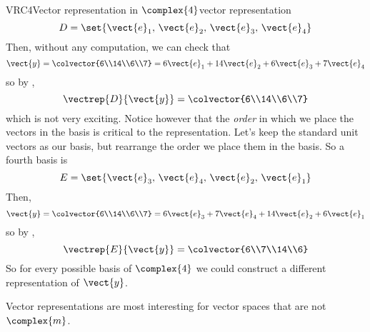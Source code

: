 \begin{example}{VRC4}{Vector representation in $\complex{4}$}{vector representation}
\begin{equation*}
D=\set{\vect{e}_1,\,\vect{e}_2,\,\vect{e}_3,\,\vect{e}_4}
\end{equation*}
%
Then, without any computation, we can check that
%
\begin{equation*}
\vect{y}=\colvector{6\\14\\6\\7}=6\vect{e}_1+14\vect{e}_2+6\vect{e}_3+7\vect{e}_4
\end{equation*}
%
so by ,
%
\begin{equation*}
\vectrep{D}{\vect{y}}=\colvector{6\\14\\6\\7}
\end{equation*}
%
which is not very exciting.  Notice however that the {\em order} in which we place the vectors in the basis is critical to the representation.  Let's keep the standard unit vectors as our basis, but rearrange the order we place them in the basis.  So a fourth basis is
%
\begin{equation*}
E=\set{\vect{e}_3,\,\vect{e}_4,\,\vect{e}_2,\,\vect{e}_1}
\end{equation*}
%
Then,
%
\begin{equation*}
\vect{y}=\colvector{6\\14\\6\\7}=6\vect{e}_3+7\vect{e}_4+14\vect{e}_2+6\vect{e}_1
\end{equation*}
%
so by ,
%
\begin{equation*}
\vectrep{E}{\vect{y}}=\colvector{6\\7\\14\\6}
\end{equation*}
%
So for every possible basis of $\complex{4}$ we could construct a different representation of $\vect{y}$.
%
\end{example}
%
Vector representations are most interesting for vector spaces that are not $\complex{m}$.
%
